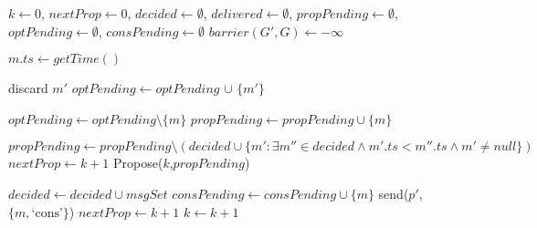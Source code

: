 \documentclass[times, 10pt]{article}
\begin{document}
\begin{algorithm}
\begin{distribalgo}[1]

\blankline
{}
  \STATE $k \leftarrow 0$, $nextProp \leftarrow 0$, $decided \leftarrow \emptyset$, $delivered \leftarrow \emptyset$, $propPending \leftarrow \emptyset$, $optPending \leftarrow \emptyset$, $consPending \leftarrow \emptyset$
    \STATE $barrier(G',G) \leftarrow -\infty$ 
  \ENDINDENT
\ENDINDENT 

\blankline
{}
  \STATE $m.ts \leftarrow getTime()$  
  \STATE {}
\ENDINDENT

\blankline
{}
    \STATE discard $m'$
  \ELSE
    \STATE $optPending \leftarrow optPending$ $\cup$ $\{m'\}$
  \ENDIF
\ENDINDENT

\blankline
{}
  \STATE $optPending \leftarrow optPending \setminus \{m\}$
    \STATE {}  
  \ENDIF
    \STATE $propPending \leftarrow propPending \cup \{m\}$
  \ENDIF
\ENDINDENT

\blankline
{}
    \STATE $propPending \leftarrow propPending \setminus (decided \cup \{m' : \exists m'' \in decided \wedge m'.ts < m''.ts \wedge m' \neq null\})$ \label{algline:nullstays}
      \STATE $nextProp \leftarrow k + 1$
      \STATE Propose($k$,$propPending$)
    \ENDIF
\ENDINDENT

\blankline
{}
  \STATE $decided \leftarrow decided \cup msgSet$ 
   \label{algline:checkcons}
    \STATE $consPending \leftarrow consPending \cup \{m\}$
  \ENDINDENT
      \STATE send($p'$, $\{m, \text{`cons'}\}$)
    \ENDINDENT
  \ENDINDENT
  \STATE $nextProp \leftarrow k + 1$
  \STATE $k \leftarrow k + 1$
\ENDINDENT


\end{distribalgo}
\end{algorithm}
\end{document}
